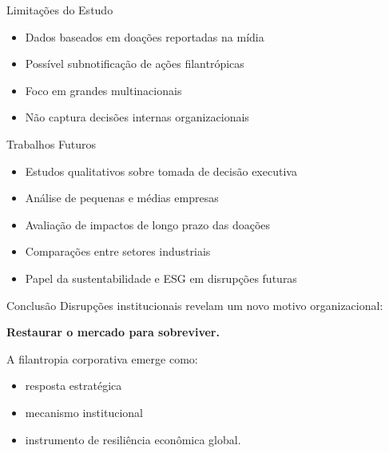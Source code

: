 \documentclass[
  10pt,
  ignorenonframetext,
  aspectratio=169,
  brazilian,
]{beamer}
\providecommand{\tightlist}{%
  \setlength{\itemsep}{0pt}\setlength{\parskip}{0pt}}
\begin{document}
\begin{frame}{Limitações do Estudo}
\label{limitauxe7uxf5es-do-estudo}
\begin{itemize}
\tightlist
\item
  Dados baseados em doações reportadas na mídia
\item
  Possível subnotificação de ações filantrópicas
\item
  Foco em grandes multinacionais
\item
  Não captura decisões internas organizacionais
\end{itemize}
\end{frame}

\begin{frame}{Trabalhos Futuros}
\label{trabalhos-futuros}
\begin{itemize}
\tightlist
\item
  Estudos qualitativos sobre tomada de decisão executiva
\item
  Análise de pequenas e médias empresas
\item
  Avaliação de impactos de longo prazo das doações
\item
  Comparações entre setores industriais
\item
  Papel da sustentabilidade e ESG em disrupções futuras
\end{itemize}
\end{frame}

\begin{frame}{Conclusão}
\label{conclusuxe3o}
Disrupções institucionais revelam um novo motivo organizacional:

\textbf{Restaurar o mercado para sobreviver.}

A filantropia corporativa emerge como:

\begin{itemize}
\tightlist
\item
  resposta estratégica
\item
  mecanismo institucional
\item
  instrumento de resiliência econômica global.
\end{itemize}
\end{frame}
\end{document}

